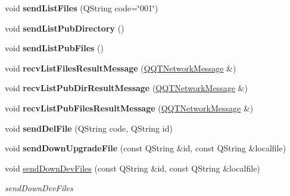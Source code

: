 \begin{DoxyCompactItemize}
void {\bfseries send\+List\+Files} (Q\+String code=\char`\"{}001\char`\"{})
\item 
\mbox{\label{class_q_q_t_cloud_protocol_a72dd0c5f23433e10a05ce634f8eb87f1}} 
void {\bfseries send\+List\+Pub\+Directory} ()
\item 
\mbox{\label{class_q_q_t_cloud_protocol_ab07bc7e690e34db45459a3c1c7295754}} 
void {\bfseries send\+List\+Pub\+Files} ()
\item 
\mbox{\label{class_q_q_t_cloud_protocol_a627cc7339b9440ca1e0287faa70db5d1}} 
void {\bfseries recv\+List\+Files\+Result\+Message} (\mbox{\hyperlink{class_q_q_t_network_message}{Q\+Q\+T\+Network\+Message}} \&)
\item 
\mbox{\label{class_q_q_t_cloud_protocol_a1920e76f7ff0e444bb2f791286b5b3e0}} 
void {\bfseries recv\+List\+Pub\+Dir\+Result\+Message} (\mbox{\hyperlink{class_q_q_t_network_message}{Q\+Q\+T\+Network\+Message}} \&)
\item 
\mbox{\label{class_q_q_t_cloud_protocol_ae350d2c75b51dbbcf85324fcadeb6c16}} 
void {\bfseries recv\+List\+Pub\+Files\+Result\+Message} (\mbox{\hyperlink{class_q_q_t_network_message}{Q\+Q\+T\+Network\+Message}} \&)
\item 
\mbox{\label{class_q_q_t_cloud_protocol_a24e11d9adc4352985171c6056c92105f}} 
void {\bfseries send\+Del\+File} (Q\+String code, Q\+String id)
\item 
\mbox{\label{class_q_q_t_cloud_protocol_aa79ee103ce86d755d6da10b1e4deaa65}} 
void {\bfseries send\+Down\+Upgrade\+File} (const Q\+String \&id, const Q\+String \&localfile)
\item 
void \mbox{\hyperlink{class_q_q_t_cloud_protocol_aa6b4270187fee501100e11efbedb3cab}{send\+Down\+Dev\+Files}} (const Q\+String \&id, const Q\+String \&localfile)
\begin{DoxyCompactList}\small\item\em send\+Down\+Dev\+Files \end{DoxyCompactList}\item 
\mbox{\label{class_q_q_t_cloud_protocol_a350e4c44473dabce35feae9dd3e9acf8}} 

\end{DoxyCompactItemize}

